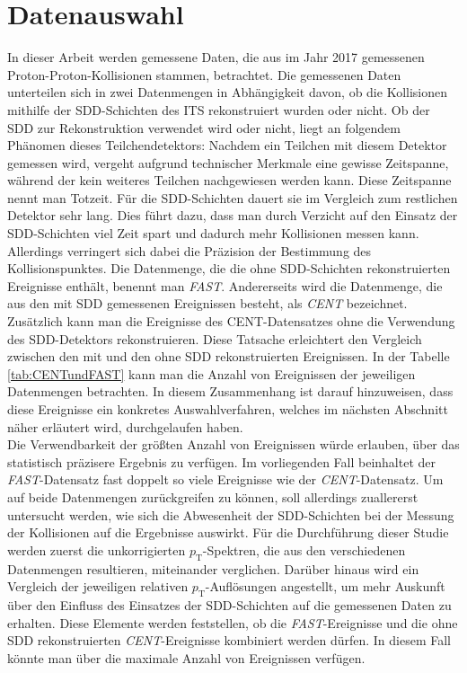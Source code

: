 \documentclass[12pt,a4paper]{report}
\begin{document}
\section{Datenauswahl}
In dieser Arbeit werden gemessene Daten, die aus im Jahr 2017 gemessenen Proton-Proton-Kollisionen stammen, betrachtet. Die gemessenen Daten unterteilen sich in zwei Datenmengen in Abhängigkeit davon, ob die Kollisionen mithilfe der SDD-Schichten des ITS rekonstruiert wurden oder nicht. Ob der SDD zur Rekonstruktion verwendet wird oder nicht, liegt an folgendem Phänomen dieses Teilchendetektors: Nachdem ein Teilchen mit diesem Detektor gemessen wird, vergeht aufgrund technischer Merkmale eine gewisse Zeitspanne, während der kein weiteres Teilchen nachgewiesen werden kann. Diese Zeitspanne nennt man Totzeit. Für die SDD-Schichten dauert sie im Vergleich zum restlichen Detektor sehr lang. Dies führt dazu, dass man durch Verzicht auf den Einsatz der SDD-Schichten viel Zeit spart und dadurch mehr Kollisionen messen kann. Allerdings verringert sich dabei die Präzision der Bestimmung des Kollisionspunktes. Die Datenmenge, die die ohne SDD-Schichten rekonstruierten Ereignisse enthält, benennt man \textit{FAST}. Andererseits wird die Datenmenge, die aus den mit SDD gemessenen Ereignissen besteht, als \textit{CENT} bezeichnet. Zusätzlich kann man die Ereignisse des CENT-Datensatzes ohne die Verwendung des SDD-Detektors rekonstruieren. Diese Tatsache erleichtert den Vergleich zwischen den mit und den ohne SDD rekonstruierten Ereignissen. In der Tabelle \ref{tab:CENTundFAST} kann man die Anzahl von Ereignissen der jeweiligen Datenmengen betrachten. In diesem Zusammenhang ist darauf hinzuweisen, dass diese Ereignisse ein konkretes Auswahlverfahren, welches im nächsten Abschnitt näher erläutert wird, durchgelaufen haben. \\
Die Verwendbarkeit der größten Anzahl von Ereignissen würde erlauben, über das statistisch präzisere Ergebnis zu verfügen. Im vorliegenden Fall beinhaltet der \textit{FAST}-Datensatz fast doppelt so viele Ereignisse wie der \textit{CENT}-Datensatz. Um auf beide Datenmengen zurückgreifen zu können, soll allerdings zuallererst untersucht werden, wie sich die Abwesenheit der SDD-Schichten bei der Messung der Kollisionen auf die Ergebnisse auswirkt. Für die Durchführung dieser Studie werden zuerst die unkorrigierten $p_{\mathrm{T}}$-Spektren, die aus den verschiedenen  Datenmengen resultieren, miteinander verglichen. Darüber hinaus wird ein Vergleich der jeweiligen relativen $p_{\mathrm{T}}$-Auflösungen angestellt, um mehr Auskunft über den Einfluss des Einsatzes der SDD-Schichten auf die gemessenen Daten zu erhalten. Diese Elemente werden feststellen, ob die \textit{FAST}-Ereignisse und die ohne SDD rekonstruierten \textit{CENT}-Ereignisse kombiniert werden dürfen. In diesem Fall könnte man über die maximale Anzahl von Ereignissen verfügen.
\end{document}
